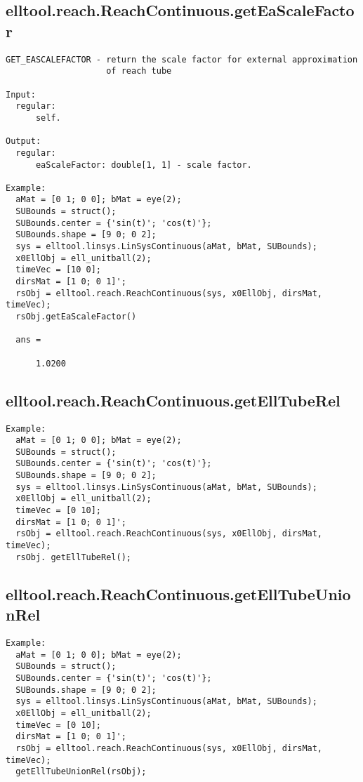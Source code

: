 \subsection{\texorpdfstring{elltool.reach.ReachContinuous.getEaScaleFactor}{getEaScaleFactor}}\label{method:elltool.reach.ReachContinuous.getEaScaleFactor}
\begin{verbatim}
GET_EASCALEFACTOR - return the scale factor for external approximation
                    of reach tube

Input:
  regular:
      self.

Output:
  regular:
      eaScaleFactor: double[1, 1] - scale factor.

Example:
  aMat = [0 1; 0 0]; bMat = eye(2);
  SUBounds = struct();
  SUBounds.center = {'sin(t)'; 'cos(t)'};
  SUBounds.shape = [9 0; 0 2];
  sys = elltool.linsys.LinSysContinuous(aMat, bMat, SUBounds);
  x0EllObj = ell_unitball(2);
  timeVec = [10 0];
  dirsMat = [1 0; 0 1]';
  rsObj = elltool.reach.ReachContinuous(sys, x0EllObj, dirsMat, timeVec);
  rsObj.getEaScaleFactor()

  ans =

      1.0200
\end{verbatim}
\subsection{\texorpdfstring{elltool.reach.ReachContinuous.getEllTubeRel}{getEllTubeRel}}\label{method:elltool.reach.ReachContinuous.getEllTubeRel}
\begin{verbatim}
Example:
  aMat = [0 1; 0 0]; bMat = eye(2);
  SUBounds = struct();
  SUBounds.center = {'sin(t)'; 'cos(t)'};
  SUBounds.shape = [9 0; 0 2];
  sys = elltool.linsys.LinSysContinuous(aMat, bMat, SUBounds);
  x0EllObj = ell_unitball(2);
  timeVec = [0 10];
  dirsMat = [1 0; 0 1]';
  rsObj = elltool.reach.ReachContinuous(sys, x0EllObj, dirsMat, timeVec);
  rsObj. getEllTubeRel();
\end{verbatim}
\subsection{\texorpdfstring{elltool.reach.ReachContinuous.getEllTubeUnionRel}{getEllTubeUnionRel}}\label{method:elltool.reach.ReachContinuous.getEllTubeUnionRel}
\begin{verbatim}
Example:
  aMat = [0 1; 0 0]; bMat = eye(2);
  SUBounds = struct();
  SUBounds.center = {'sin(t)'; 'cos(t)'};
  SUBounds.shape = [9 0; 0 2];
  sys = elltool.linsys.LinSysContinuous(aMat, bMat, SUBounds);
  x0EllObj = ell_unitball(2);
  timeVec = [0 10];
  dirsMat = [1 0; 0 1]';
  rsObj = elltool.reach.ReachContinuous(sys, x0EllObj, dirsMat, timeVec);
  getEllTubeUnionRel(rsObj);
\end{verbatim}
